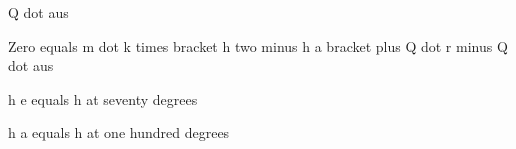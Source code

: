 Q dot aus

Zero equals m dot k times bracket h two minus h a bracket plus Q dot r minus Q dot aus

h e equals h at seventy degrees

h a equals h at one hundred degrees